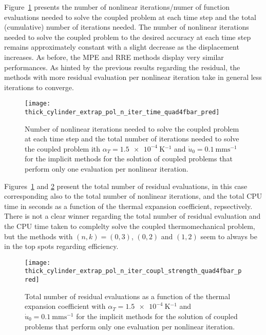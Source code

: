 Figure~\ref{fig:thick_cylinder_extrap_pol_n_iter_time_quad4fbar_pred} presents the number of nonlinear iterations/numer of function evaluations needed to solve the coupled problem at each time step and the total (cumulative) number of iterations needed.
The number of nonlinear iterations needed to solve the coupled problem to the desired accuracy at each time step remains approximately constant with a slight decrease as the displacement increases.
As before, the MPE and RRE methods display very similar performances.
As hinted by the previous results regarding the residual, the methods with more residual evaluation per nonlinear iteration take in general less iterations to converge.

\begin{figure}
  \texttt{[image: thick\_cylinder\_extrap\_pol\_n\_iter\_time\_quad4fbar\_pred]}
  \caption{Number of nonlinear iterations needed to solve the coupled problem at each time step and the total number of iterations needed to solve the coupled problem ith \(\alpha_T=\SI{1.5e-4}{\kelvin^{-1}}\) and \(\dot u_0 =\SI{0.1}{\milli\meter\second^{-1}}\) for the implicit methods for the solution of coupled problems that perform only one evaluation per nonlinear iteration.}
\label{fig:thick_cylinder_extrap_pol_n_iter_time_quad4fbar_pred}
\end{figure}

Figures~\ref{fig:thick_cylinder_extrap_pol_n_iter_time_quad4fbar_pred} and \ref{fig:thick_cylinder_extrap_pol_n_iter_coupl_strength_quad4fbar_pred} present the total number of residual evaluations, in this case corresponding also to the total number of nonlinear iterations, and the total CPU time in seconds as a function of the thermal expansion coefficient, repsectively.
There is not a clear winner regarding the total number of residual evaluation and the CPU time taken to complelty solve the coupled thermomechanical problem, but the methods with \((n,k)=(0,3)\), \((0,2)\) and \((1,2)\) seem to always be in the top spots regarding efficiency.

\begin{figure}
  \texttt{[image: thick\_cylinder\_extrap\_pol\_n\_iter\_coupl\_strength\_quad4fbar\_pred]}
  \caption{Total number of residual evaluations as a function of the thermal expansion coefficient with \(\alpha_T=\SI{1.5e-4}{\kelvin^{-1}}\) and \(\dot u_0 =\SI{0.1}{\milli\meter\second^{-1}}\) for the implicit methods for the solution of coupled problems that perform only one evaluation per nonlinear iteration.}
\label{fig:thick_cylinder_extrap_pol_n_iter_coupl_strength_quad4fbar_pred}
\end{figure}

